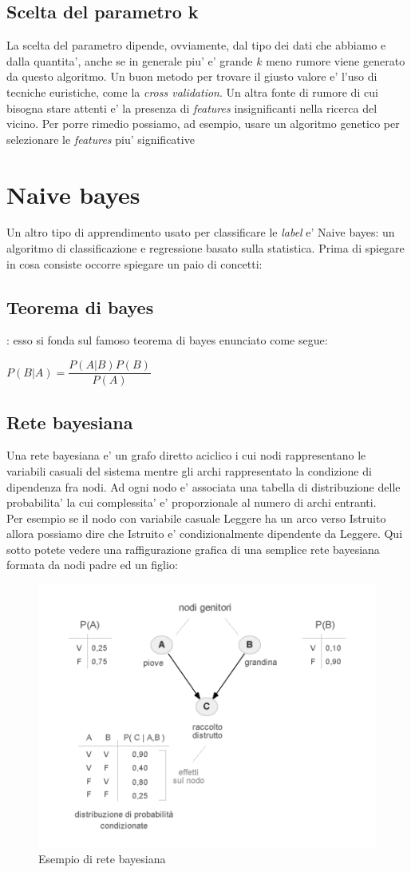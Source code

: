 \subsection*{Scelta del parametro k}
La scelta del parametro dipende, ovviamente, dal tipo dei dati che abbiamo e dalla quantita', anche se in generale piu' e' grande $k$ meno rumore viene generato da questo algoritmo. Un buon metodo per trovare il giusto valore e' l'uso di tecniche euristiche, come la \textit{cross validation}. Un altra fonte di rumore di cui bisogna stare attenti e' la presenza di \textit{features} insignificanti nella ricerca del vicino. Per porre rimedio possiamo, ad esempio, usare un algoritmo genetico per selezionare le \textit{features} piu' significative

\section*{Naive bayes}
Un altro tipo di apprendimento usato per classificare le \textit{label} e' Naive bayes: un algoritmo di classificazione e regressione basato sulla statistica. Prima di spiegare in cosa consiste occorre spiegare un paio di concetti:
\subsection*{Teorema di bayes}
: esso si fonda sul famoso teorema di bayes enunciato come segue:
\begin{center}
	$P(B|A) = \dfrac{P(A|B)P(B)}{P(A)}$
\end{center}
\subsection*{Rete bayesiana}
Una rete bayesiana e' un grafo diretto aciclico i cui nodi rappresentano le variabili casuali del sistema mentre gli archi rappresentato la condizione di dipendenza fra nodi.
 Ad ogni nodo e' associata una tabella di distribuzione delle probabilita' la cui complessita' e' proporzionale al numero di archi entranti.\\ Per esempio se il nodo con variabile casuale Leggere ha un arco verso Istruito allora possiamo dire che Istruito e' condizionalmente dipendente da Leggere. Qui sotto potete vedere una raffigurazione grafica di una semplice rete bayesiana formata da nodi padre ed un figlio:
\begin{figure}[H]
	\centering
	\includegraphics[width=0.7\linewidth]{img/rete-bayesiana-grafo.png}
	\caption{Esempio di rete bayesiana}
	\label{fig:rete-bayesiana-grafo}
\end{figure}
\medskip
